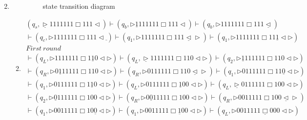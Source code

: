 \documentclass[12pt,a4paper]{article}
\makeatletter
\newtheorem*{solution}{Solution}
\theoremstyle{definition}
\renewenvironment{solution}[1][Solution] {\par\pushQED{\qed}\normalfont\topsep6\p@\@plus6\p@\relax\trivlist\item[\hskip\labelsep\bfseries#1\@addpunct{.}]\ignorespaces}{\popQED\endtrivlist\@endpefalse} \makeatother
\makeatother
\begin{document}
\begin{enumerate}
\begin{solution}
\begin{enumerate}
\begin{figure}[htbp]
        \caption{state transition diagram}\label{std}
        \end{figure}
        \item
        \begin{equation}
            \begin{aligned}
            (q_s,\underline{\triangleright}  1  1  1  1  1  1  1  \Box 1  1  1   \triangleleft)
	\vdash (q_b,\triangleright  \underline{1}  1  1  1  1  1  1  \Box 1  1  1   \triangleleft)
	\vdash(q_b,\triangleright  1  1  1  1  1  1  1 \Box 1  1  1   \underline{\triangleleft} )\\
	\vdash(q_c,\triangleright  1  1  1  1  1  1  1  \Box 1  1  1   \triangleleft \underline{~})
	\vdash(q_1,\triangleright  1  1  1  1  1  1  1 \Box 1  1  1    \underline{\triangleleft} \triangleright )\vdash(q_1,\triangleright  1  1  1  1  1  1  1 \Box 1  1  \underline{1}    \triangleleft \triangleright)\\
	First~round~~~~~~~~~~~~~~~~~~~~~~~~~~~~~~~~~~~~~~~~~~~~~~~~~~~~~~~~~~~~~\\
	\vdash(q_L,\triangleright  1  1  1  1  1  1  1 \Box 1  \underline{1}  0    \triangleleft \triangleright )\vdash(q_L,\underline{\triangleright}  1  1  1  1  1  1  1 \Box 1  1  0    \triangleleft \triangleright )\vdash(q_2,\triangleright  \underline{1}  1  1  1  1  1  1 \Box 1  1  0    \triangleleft \triangleright )\\
	\vdash(q_R,\triangleright  0  \underline{1}  1  1  1  1  1 \Box 1  1  0    \triangleleft \triangleright )\vdash(q_R,\triangleright  0  1  1  1  1  1  1 \Box 1  1  0    \underline{\triangleleft} \triangleright )\vdash(q_1,\triangleright  0  1  1  1  1  1  1 \Box 1  1  \underline{0}    \triangleleft \triangleright )\\
	\vdash(q_1,\triangleright  0  1  1  1  1  1  1 \Box 1  \underline{1}  0    \triangleleft \triangleright )\vdash(q_L,\triangleright  0  1  1  1  1  1  1 \Box \underline{1}  0  0    \triangleleft \triangleright )\vdash(q_L,\underline{\triangleright}  0  1  1  1  1  1  1 \Box 1  0  0    \triangleleft \triangleright )\\
	\vdash(q_2,\triangleright  \underline{0}  1  1  1  1  1  1 \Box 1  0  0    \triangleleft \triangleright )\vdash(q_R,\triangleright  0 \underline{0}    1  1  1  1  1 \Box 1  0  0    \triangleleft \triangleright )\vdash(q_R,\triangleright  0 0    1  1  1  1  1 \Box 1  0  0    \underline{\triangleleft} \triangleright )\\
	\vdash(q_1,\triangleright  0 0    1  1  1  1  1 \Box 1  0  \underline{0}    \triangleleft \triangleright )\vdash(q_1,\triangleright  0 0    1  1  1  1  1 \Box \underline{1}  0  0    \triangleleft \triangleright )\vdash(q_L,\triangleright  0 0    1  1  1  1  1 \underline{\Box} 0  0  0    \triangleleft \triangleright )\\

\end{aligned}
\end{equation}
\end{enumerate}
\end{solution}
\end{enumerate}
\end{document}
